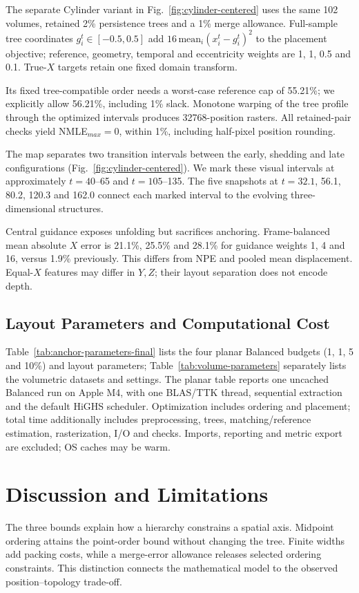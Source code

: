 \documentclass[review]{vgtc}
\begin{document}
The separate Cylinder variant in Fig.~\ref{fig:cylinder-centered} uses the same 102 volumes, retained 2\% persistence trees and a 1\% merge allowance. Full-sample tree coordinates $g_i^t\in[-0.5,0.5]$ add $16\,\mathrm{mean}_i(x_i^t-g_i^t)^2$ to the placement objective; reference, geometry, temporal and eccentricity weights are 1, 1, 0.5 and 0.1. True-$X$ targets retain one fixed domain transform. 

Its fixed tree-compatible order needs a worst-case reference cap of 55.21\%; we explicitly allow 56.21\%, including 1\% slack. Monotone warping of the tree profile through the optimized intervals produces 32768-position rasters. All retained-pair checks yield NMLE$_{max}=0$, within 1\%, including half-pixel position rounding.

The map separates two transition intervals between the early, shedding and late configurations (Fig.~\ref{fig:cylinder-centered}). We mark these visual intervals at approximately $t=40$--65 and $t=105$--135. The five snapshots at $t=32.1$, 56.1, 80.2, 120.3 and 162.0 connect each marked interval to the evolving three-dimensional structures.

Central guidance exposes unfolding but sacrifices anchoring. Frame-balanced mean absolute $X$ error is 21.1\%, 25.5\% and 28.1\% for guidance weights 1, 4 and 16, versus 1.9\% previously. This differs from NPE and pooled mean displacement. Equal-$X$ features may differ in $Y,Z$; their layout separation does not encode depth.

\subsection{Layout Parameters and Computational Cost}
Table~\ref{tab:anchor-parameters-final} lists the four planar Balanced budgets (1, 1, 5 and 10\%) and layout parameters; Table~\ref{tab:volume-parameters} separately lists the volumetric datasets and settings. The planar table reports one uncached Balanced run on Apple M4, with one BLAS/TTK thread, sequential extraction and the default HiGHS scheduler. Optimization includes ordering and placement; total time additionally includes preprocessing, trees, matching/reference estimation, rasterization, I/O and checks. Imports, reporting and metric export are excluded; OS caches may be warm. 

\section{Discussion and Limitations}
The three bounds explain how a hierarchy constrains a spatial axis. Midpoint ordering attains the point-order bound without changing the tree. Finite widths add packing costs, while a merge-error allowance releases selected ordering constraints. This distinction connects the mathematical model to the observed position--topology trade-off.
\end{document}
